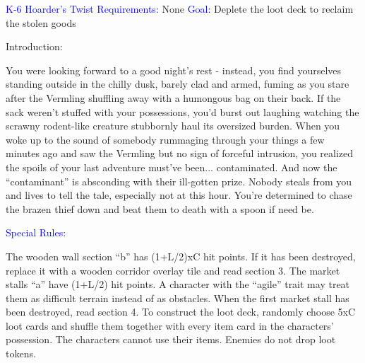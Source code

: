 \documentclass[fontsize=11pt]{scrartcl}
\begin{document}
  \BgThispage
	\vspace*{-0.25cm} \hskip 1.85cm {\myfont\textcolor{Blue}{K-6 \LARGE{Hoarder's Twist}}}\vspace*{0.4cm}\newline\newline
	{\myfont\LARGE{\textcolor{Blue}{Requirements:}} \normalsize{None}}\newline
	{\myfont\LARGE{\textcolor{Blue}{Goal:}} \normalsize{Deplete the loot deck to reclaim the stolen goods}}\newline\newline
	\begin{minipage}{0.3\textwidth}
	  \begin{center}
		  {\myfont\LARGE{\textcolor{OliveGreen}{Introduction:}}}
		\end{center}
    \footnotesize{You were looking forward to a good night’s rest - instead, you find yourselves standing outside in the chilly dusk, barely clad and armed, fuming as you stare after the Vermling shuffling away with a humongous bag on their back. If the sack weren’t stuffed with your possessions, you’d burst out laughing watching the scrawny rodent-like creature stubbornly haul its oversized burden.
When you woke up to the sound of somebody rummaging through your things a few minutes ago and saw the Vermling but no sign of forceful intrusion, you realized the spoils of your last adventure must’ve been... contaminated. And now the “contaminant” is absconding with their ill-gotten prize.\newline\newline
Nobody steals from you and lives to tell the tale, especially not at this hour. You’re determined to chase the brazen thief down and beat them to death with a spoon if need be.}
    \begin{center}
	    {\myfont\LARGE{\textcolor{Blue}{Special Rules:}}}
		\end{center}
	  \footnotesize{The wooden wall section “b” has (1+L/2)xC hit points. If it has been destroyed, replace it with a wooden corridor overlay tile and read section 3.\newline
The market stalls “a” have (1+L/2) hit points. A character with the “agile” trait may treat them as difficult terrain instead of as obstacles. When the first market stall has been destroyed, read section 4.\newline
To construct the loot deck, randomly choose 5xC loot cards and shuffle them together with every item card in the characters’ possession. The characters cannot use their items. Enemies do not drop loot tokens.\newline\newline
}
\end{minipage}
\end{document}
